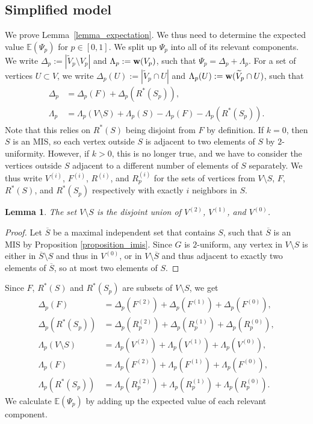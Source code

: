 \documentclass{article}
\theoremstyle{plain}
\theoremstyle{remark}
\theoremstyle{plain}
\newtheorem{lemma}[theorem]{Lemma}
\numberwithin{equation}{section}
\renewcommand{\b}{{\bf{w}}}
\begin{document}
	\subsection{Simplified model}\label{subsection_proof_simplified}
	
	We prove Lemma~\ref{lemma_expectation}. We thus need to determine the expected value $\mathbb{E}(\Psi_p)$ for $p\in[0,1]$. We split up $\Psi_p$ into all of its relevant components. We write $\Delta_p:=|\widetilde{V}_p\setminus V_p|$ and $\Lambda_p:=\b(V_p)$, such that $\Psi_p=\Delta_p+\Lambda_p$. For a set of vertices $U\subset V$, we write $\Delta_p(U):=|\widetilde{V}_p\cap U|$ and $\Lambda_p(U):=\b(\widetilde{V}_p\cap U)$, such that
	\begin{align}
		\Delta_p&=\Delta_p(F)+\Delta_p(R^*(S_p)),
		\\\Lambda_p&=\Lambda_p(V\setminus S)+\Lambda_p(S)-\Lambda_p(F)-\Lambda_p(R^*(S_p)).
	\end{align}
	Note that this relies on $R^*(S)$ being disjoint from $F$ by definition. If $k=0$, then $S$ is an MIS, so each vertex outside $S$ is adjacent to two elements of $S$ by $2$-uniformity. However, if $k>0$, this is no longer true, and we have to consider the vertices outside $S$ adjacent to a different number of elements of $S$ separately. We thus write $V^{(i)}$, $F^{(i)}$, $R^{(i)}$, and $R_p^{(i)}$ for the sets of vertices from $V\setminus S$, $F$, $R^*(S)$, and $R^*(S_p)$ respectively with exactly $i$ neighbors in $S$.
	
	\begin{lemma}\label{lemma_vi}
		The set $V\setminus S$ is the disjoint union of $V^{(2)}$, $V^{(1)}$, and $V^{(0)}$.
	\end{lemma}
	
	\begin{proof}
		Let $\overline{S}$ be a maximal independent set that contains $S$, such that $\overline{S}$ is an MIS by Proposition \ref{proposition_imis}. Since $G$ is $2$-uniform, any vertex in $V\setminus S$ is either in $\overline{S}\setminus S$ and thus in $V^{(0)}$, or in $V\setminus\overline{S}$ and thus adjacent to exactly two elements of $\overline{S}$, so at most two elements of $S$.
	\end{proof}
	
	Since $F$, $R^*(S)$ and $R^*(S_p)$ are subsets of $V\setminus S$, we get
	\begin{align}
		\Delta_p(F)&=\Delta_p(F^{(2)})+\Delta_p(F^{(1)})+\Delta_p(F^{(0)}),
		\\\Delta_p(R^*(S_p))&=\Delta_p(R^{(2)}_p)+\Delta_p(R^{(1)}_p)+\Delta_p(R^{(0)}_p),
		\\\Lambda_p(V\setminus S)&=\Lambda_p(V^{(2)})+\Lambda_p(V^{(1)})+\Lambda_p(V^{(0)}),
		\\\Lambda_p(F)&=\Lambda_p(F^{(2)})+\Lambda_p(F^{(1)})+\Lambda_p(F^{(0)}),
		\\\Lambda_p(R^*(S_p))&=\Lambda_p(R^{(2)}_p)+\Lambda_p(R^{(1)}_p)+\Lambda_p(R^{(0)}_p).
	\end{align}
	We calculate $\mathbb{E}(\Psi_p)$ by adding up the expected value of each relevant component.
	
\end{document}
